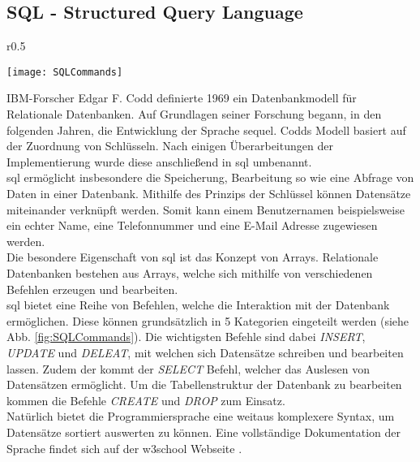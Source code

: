 \subsection{SQL - Structured Query Language}
\begin{wrapfigure}{r}{0.5\textwidth}
    \vspace{-1.2cm}
    \begin{center}
      \texttt{[image: SQLCommands]}
    \end{center}
    \vspace{-0.5cm}
    \caption{SQL Befehls Kategorien \cite{SQLCommands}}
    \label{fig:SQLCommands}
    \vspace{-0.5cm}
  \end{wrapfigure}
IBM-Forscher Edgar F. Codd definierte 1969 ein Datenbankmodell für Relationale Datenbanken. Auf Grundlagen seiner Forschung begann, in den folgenden Jahren, die Entwicklung der Sprache \ac{sequel}. Codds Modell basiert auf der Zuordnung von Schlüsseln. Nach einigen Überarbeitungen der Implementierung wurde diese anschließend in \ac{sql} umbenannt.\cite{SQL}\\
\ac{sql} ermöglicht insbesondere die Speicherung, Bearbeitung so wie eine Abfrage von Daten in einer Datenbank. Mithilfe des Prinzips der Schlüssel können Datensätze miteinander verknüpft werden. Somit kann einem Benutzernamen beispielsweise ein echter Name, eine Telefonnummer und eine E-Mail Adresse zugewiesen werden.\cite{SQL}\\
Die besondere Eigenschaft von \ac{sql} ist das Konzept von Arrays. Relationale Datenbanken bestehen aus Arrays, welche sich mithilfe von verschiedenen Befehlen erzeugen und bearbeiten. \cite{SQL}\\
\ac{sql} bietet eine Reihe von Befehlen, welche die Interaktion mit der Datenbank ermöglichen. Diese können grundsätzlich in 5 Kategorien eingeteilt werden (siehe Abb. \ref{fig:SQLCommands}). Die wichtigsten Befehle sind dabei \textit{INSERT}, \textit{UPDATE} und \textit{DELEAT}, mit welchen sich Datensätze schreiben und bearbeiten lassen. Zudem der kommt der \textit{SELECT} Befehl, welcher das Auslesen von Datensätzen ermöglicht. Um die Tabellenstruktur der Datenbank zu bearbeiten kommen die Befehle \textit{CREATE} und \textit{DROP} zum Einsatz. \cite{SQLCommands}\\
Natürlich bietet die Programmiersprache eine weitaus komplexere Syntax, um Datensätze sortiert auswerten zu können. Eine vollständige Dokumentation der Sprache findet sich auf der w3school Webseite \cite{SQLDoku}.